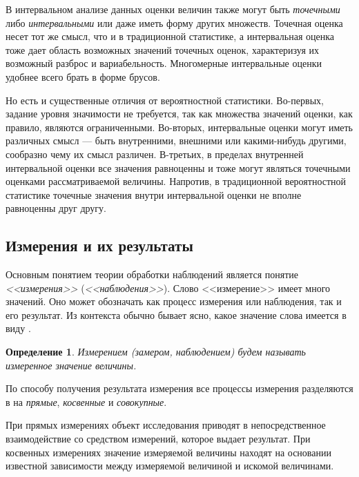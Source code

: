 \documentclass[a5paper,openany]{book}
\newtheorem{definition}{Определение}[section]
\begin{document}
{{В интервальном анализе данных оценки величин также могут быть \emph{точечными} 
либо \emph{интервальными} или даже иметь форму других множеств. Точечная оценка 
несет тот же смысл, что и в традиционной статистике, а интервальная оценка тоже дает 
область возможных значений точечных оценок, характеризуя их возможный разброс и 
вариабельность. Многомерные интервальные оценки удобнее всего брать в форме брусов. 

Но есть и существенные отличия от вероятностной статистики. 
Во-первых, задание уровня  значимости не требуется, так как множества значений оценки, как правило, являются ограниченными. 
Во-вторых, интервальные оценки могут иметь различных смысл --- быть внутренними, 
внешними или какими-нибудь другими, сообразно чему их смысл различен. 
В-третьих, в пределах внутренней интервальной оценки все значения равноценны и тоже могут являться точечными оценками рассматриваемой величины. 
Напротив, в традиционной вероятностной статистике точечные значения внутри интервальной 
оценки не вполне равноценны друг другу. 

\subsection{Измерения и их результаты} 
\label{MeasuResultSect}

	Основным понятием теории обработки наблюдений является понятие \emph{<<измерения>>} (\emph{<<наблюдения>>}). Слово <<измерение>> имеет много значений. Оно может 
обозначать как процесс измерения или наблюдения, так и его результат. Из контекста обычно 
бывает ясно, какое значение слова имеется в виду \cite{MetodikaBook}.  
\vspace{-2mm}
\begin{definition}       
	\textsl{Измерением (замером, наблюдением)} будем называть измеренное значение величины. 
\end{definition}
\vspace{-2mm}
\noindent
По способу получения результата измерения все процессы измерения разделяются 
в \cite{Malikov} на \emph{прямые}, \emph{косвенные} и \emph{совокупные}. 

При прямых измерениях объект исследования приводят в непосредственное взаимодействие 
со средством измерений, которое выдает результат.   
При косвенных измерениях значение измеряемой величины находят на основании  
известной зависимости между измеряемой величиной и искомой величинами. 

}}
\end{document}
